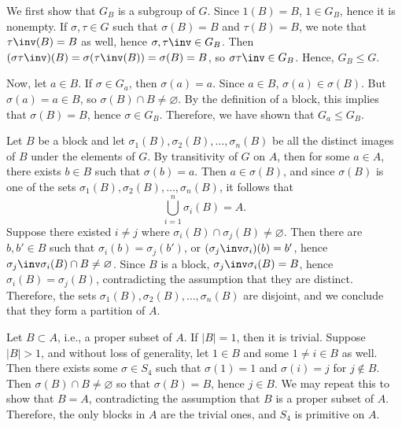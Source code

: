 \begin{solenum}[spsol]
	\item We first show that $G_B$ is a subgroup of $G$.
	Since $1(B) = B$, $1 \in G_B$, hence it is nonempty.
	If $\sigma, \tau \in G$ such that $\sigma(B) = B$ and $\tau(B) = B$, we note that $\tau\inv(B) = B$ as well, hence $\sigma, \tau\inv \in G_B$.
	Then $(\sigma\tau\inv)(B) = \sigma(\tau\inv(B)) = \sigma(B) = B$, so $\sigma\tau\inv \in G_B$.
	Hence, $G_B \leq G$.
	
	Now, let $a \in B$.
	If $\sigma \in G_a$, then $\sigma(a) = a$.
	Since $a \in B$, $\sigma(a) \in \sigma(B)$.
	But $\sigma(a) = a \in B$, so $\sigma(B) \cap B \neq \varnothing$.
	By the definition of a block, this implies that $\sigma(B) = B$, hence $\sigma \in G_B$.
	Therefore, we have shown that $G_a \leq G_B$.
	\item Let $B$ be a block and let $\sigma_1(B), \sigma_2(B), \ldots, \sigma_n(B)$ be all the distinct images of $B$ under the elements of $G$.
	By transitivity of $G$ on $A$, then for some $a \in A$, there exists $b \in B$ such that $\sigma(b) = a$.
	Then $a \in \sigma(B)$, and since $\sigma(B)$ is one of the sets $\sigma_1(B), \sigma_2(B), \ldots, \sigma_n(B)$, it follows that
	\[
		\bigcup_{i=1}^n \sigma_i(B) = A.
	\]
	Suppose there existed $i \neq j$ where $\sigma_i(B) \cap \sigma_j(B) \neq \varnothing$.
	Then there are $b, b' \in B$ such that $\sigma_i(b) = \sigma_j(b')$, or $(\sigma_j\inv\sigma_i)(b) = b'$, hence $\sigma_j\inv\sigma_i(B) \cap B \neq \varnothing$.
	Since $B$ is a block, $\sigma_j\inv\sigma_i(B) = B$, hence $\sigma_i(B) = \sigma_j(B)$, contradicting the assumption that they are distinct.
	Therefore, the sets $\sigma_1(B), \sigma_2(B), \ldots, \sigma_n(B)$ are disjoint, and we conclude that they form a partition of $A$.
	\item Let $B \subset A$, i.e., a proper subset of $A$.
	If $|B| = 1$, then it is trivial.
	Suppose $|B| > 1$, and without loss of generality, let $1 \in B$ and some $1 \neq i \in B$ as well.
	Then there exists some $\sigma \in S_4$ such that $\sigma(1) = 1$ and $\sigma(i) = j$ for $j \notin B$.
	Then $\sigma(B) \cap B \neq \varnothing$ so that $\sigma(B) = B$, hence $j \in B$.
	We may repeat this to show that $B = A$, contradicting the assumption that $B$ is a proper subset of $A$.
	Therefore, the only blocks in $A$ are the trivial ones, and $S_4$ is primitive on $A$.
	

\end{solenum}
